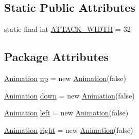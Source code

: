 \subsection*{Static Public Attributes}
\begin{DoxyCompactItemize}
\item 
static final int \mbox{\hyperlink{classitems_1_1weapons_1_1_sword_a2f54a51059264ae578a63bf4d5a56221}{A\+T\+T\+A\+C\+K\+\_\+\+W\+I\+D\+TH}} = 32
\end{DoxyCompactItemize}
\subsection*{Package Attributes}
\begin{DoxyCompactItemize}
\item 
\mbox{\hyperlink{classorg_1_1newdawn_1_1slick_1_1_animation}{Animation}} \mbox{\hyperlink{classitems_1_1weapons_1_1_sword_a51568efb680439ac983310f400c495bb}{up}} = new \mbox{\hyperlink{classorg_1_1newdawn_1_1slick_1_1_animation}{Animation}}(false)
\item 
\mbox{\hyperlink{classorg_1_1newdawn_1_1slick_1_1_animation}{Animation}} \mbox{\hyperlink{classitems_1_1weapons_1_1_sword_a097785c8f06e25a2aede4884b9f49946}{down}} = new \mbox{\hyperlink{classorg_1_1newdawn_1_1slick_1_1_animation}{Animation}}(false)
\item 
\mbox{\hyperlink{classorg_1_1newdawn_1_1slick_1_1_animation}{Animation}} \mbox{\hyperlink{classitems_1_1weapons_1_1_sword_a243c3b4902003800080825055b4d5e4b}{left}} = new \mbox{\hyperlink{classorg_1_1newdawn_1_1slick_1_1_animation}{Animation}}(false)
\item 
\mbox{\hyperlink{classorg_1_1newdawn_1_1slick_1_1_animation}{Animation}} \mbox{\hyperlink{classitems_1_1weapons_1_1_sword_a5100ab52b0a0f565d2c85f7ca49602c7}{right}} = new \mbox{\hyperlink{classorg_1_1newdawn_1_1slick_1_1_animation}{Animation}}(false)
\end{DoxyCompactItemize}
